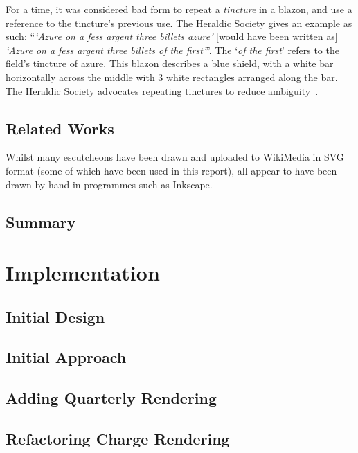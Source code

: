 \documentclass[nobib, a4paper, twoside, justified]{tufte-book}
\begin{document}
For a time, it was considered bad form to repeat a \textit{tincture} in a blazon, and use a
reference to the tincture's previous use. The Heraldic Society gives an example as such:
``\textit{`Azure on a fess argent three billets azure'} [would have been written as] \textit{`Azure
on a fess argent three billets of the first'}''. The `\textit{of the first}' refers to the field's
tincture of azure. This blazon describes a blue shield, with a white bar horizontally across the
middle with 3 white rectangles arranged along the bar. The Heraldic Society advocates repeating
tinctures to reduce ambiguity~\autocite{blazon_in_coa}.

\section{Related Works}%
\label{sec:related_works}

Whilst many escutcheons have been drawn and uploaded to WikiMedia in SVG format (some of which have
been used in this report), all appear to have been drawn by hand in programmes such as Inkscape.

\section{Summary}%

\chapter{Implementation}%
\label{cha:implementation}

\section{Initial Design}%
\label{sec:initial_design}

\section{Initial Approach}%
\label{sec:initial_approach}

\section{Adding Quarterly Rendering}%
\label{sec:adding_quarterly_rendering}

\section{Refactoring Charge Rendering}%
\label{sec:refactoring_charge_rendering}
\end{document}
